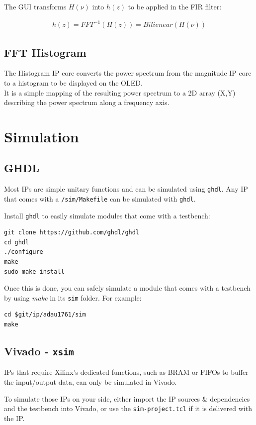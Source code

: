 \documentclass{article}
\begin{document}
The GUI transforms $H(\nu)$ into $h(z)$
to be applied in the FIR filter:

\begin{equation}
	\begin{split}
	h(z) = FFT^{-1}\left(H(z)\right) = Bilienear(H(\nu))
	\end{split}
\end{equation}

\newpage
\subsection{FFT Histogram}

The Histogram IP core converts
the power spectrum from the
magnitude IP core
to a histogram to be displayed on the OLED. \\

It is a simple mapping of the resulting
power spectrum to a 2D array (X,Y) describing
the power spectrum along a frequency axis. \\ 


\section{Simulation}

\subsection{GHDL}

Most IPs are simple unitary functions
and can be simulated using {\tt ghdl}.
Any IP that comes with a {\tt /sim/Makefile}
can be simulated with {\tt ghdl}.

Install {\tt ghdl} to easily
simulate modules that come with a testbench:

\begin{verbatim}
git clone https://github.com/ghdl/ghdl
cd ghdl
./configure
make
sudo make install
\end{verbatim}

Once this is done, you can safely simulate a module
that comes with a testbench by using {\it make}
in its {\tt sim} folder.
For example:

\begin{verbatim}
cd $git/ip/adau1761/sim
make
\end{verbatim}

\subsection{Vivado - {\tt xsim}}

IPs that require Xilinx's dedicated functions,
such as BRAM or FIFOs to buffer the input/output
data, can only be simulated in Vivado.

To simulate those IPs on your side, either
import the IP sources \& dependencies and the testbench
into Vivado, or use the {\tt sim-project.tcl} if
it is delivered with the IP.
\end{document}
